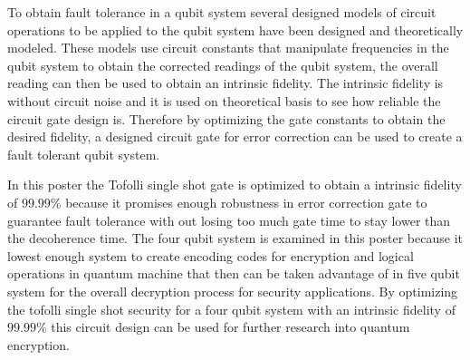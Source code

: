 \documentclass{article}
\begin{document}
To obtain fault tolerance in a qubit system several designed models of circuit operations to be applied to the qubit system have been designed and theoretically modeled. These models use circuit constants that manipulate frequencies in the qubit system to obtain the corrected readings of the qubit system, the overall reading can then be used to obtain an intrinsic fidelity. The intrinsic fidelity is without circuit noise and it is used on theoretical basis to see how reliable the circuit gate design is. Therefore by optimizing the gate constants to obtain the desired fidelity, a designed circuit gate for error correction can be used to create a fault tolerant qubit system. 

In this poster the Tofolli single shot gate is optimized to obtain a intrinsic fidelity of $99.99\%$ because it promises enough robustness in error correction gate to guarantee fault tolerance with out losing too much gate time to stay lower than the decoherence time. The four qubit system is examined in this poster because it lowest enough system to create encoding codes for encryption and logical operations in quantum machine that then can be taken advantage of in five qubit system for the overall decryption process for security applications. By optimizing the tofolli single shot security for a four qubit system with an intrinsic fidelity of $99.99\%$ this circuit design can be used for further research into quantum encryption.              
\end{document}
